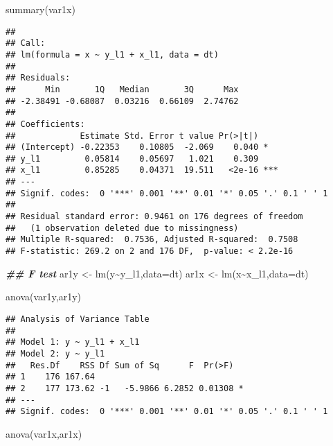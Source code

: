 \documentclass[
  oneside]{book}
\newenvironment{Shaded}{\begin{snugshade}}{\end{snugshade}}
\newcommand{\AttributeTok}[1]{\textcolor[rgb]{0.77,0.63,0.00}{#1}}
\newcommand{\DocumentationTok}[1]{\textcolor[rgb]{0.56,0.35,0.01}{\textbf{\textit{#1}}}}
\newcommand{\FunctionTok}[1]{\textcolor[rgb]{0.00,0.00,0.00}{#1}}
\newcommand{\NormalTok}[1]{#1}
\newcommand{\OtherTok}[1]{\textcolor[rgb]{0.56,0.35,0.01}{#1}}
\newcommand{\SpecialCharTok}[1]{\textcolor[rgb]{0.00,0.00,0.00}{#1}}
\begin{document}
\begin{Shaded}
\begin{Highlighting}[]
\FunctionTok{summary}\NormalTok{(var1x)}
\end{Highlighting}
\end{Shaded}

\begin{verbatim}
## 
## Call:
## lm(formula = x ~ y_l1 + x_l1, data = dt)
## 
## Residuals:
##      Min       1Q   Median       3Q      Max 
## -2.38491 -0.68087  0.03216  0.66109  2.74762 
## 
## Coefficients:
##             Estimate Std. Error t value Pr(>|t|)    
## (Intercept) -0.22353    0.10805  -2.069    0.040 *  
## y_l1         0.05814    0.05697   1.021    0.309    
## x_l1         0.85285    0.04371  19.511   <2e-16 ***
## ---
## Signif. codes:  0 '***' 0.001 '**' 0.01 '*' 0.05 '.' 0.1 ' ' 1
## 
## Residual standard error: 0.9461 on 176 degrees of freedom
##   (1 observation deleted due to missingness)
## Multiple R-squared:  0.7536, Adjusted R-squared:  0.7508 
## F-statistic: 269.2 on 2 and 176 DF,  p-value: < 2.2e-16
\end{verbatim}

\begin{Shaded}
\begin{Highlighting}[]
\DocumentationTok{\#\# F test}
\NormalTok{ar1y }\OtherTok{\textless{}{-}} \FunctionTok{lm}\NormalTok{(y}\SpecialCharTok{\textasciitilde{}}\NormalTok{y\_l1,}\AttributeTok{data=}\NormalTok{dt)}
\NormalTok{ar1x }\OtherTok{\textless{}{-}} \FunctionTok{lm}\NormalTok{(x}\SpecialCharTok{\textasciitilde{}}\NormalTok{x\_l1,}\AttributeTok{data=}\NormalTok{dt)}

\FunctionTok{anova}\NormalTok{(var1y,ar1y)}
\end{Highlighting}
\end{Shaded}

\begin{verbatim}
## Analysis of Variance Table
## 
## Model 1: y ~ y_l1 + x_l1
## Model 2: y ~ y_l1
##   Res.Df    RSS Df Sum of Sq      F  Pr(>F)  
## 1    176 167.64                              
## 2    177 173.62 -1   -5.9866 6.2852 0.01308 *
## ---
## Signif. codes:  0 '***' 0.001 '**' 0.01 '*' 0.05 '.' 0.1 ' ' 1
\end{verbatim}

\begin{Shaded}
\begin{Highlighting}[]
\FunctionTok{anova}\NormalTok{(var1x,ar1x)}
\end{Highlighting}
\end{Shaded}
\end{document}
